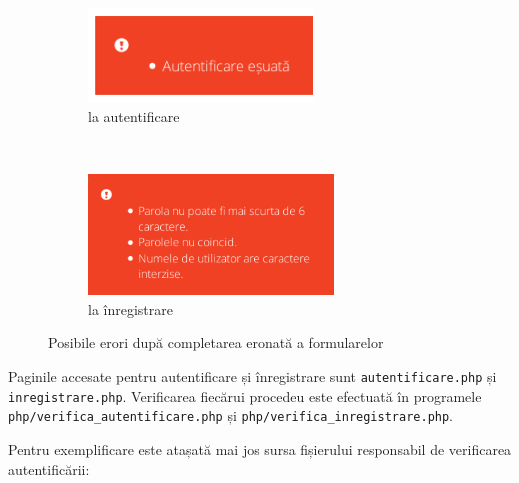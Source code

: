 \documentclass[12pt,a4paper]{article}
\begin{document}
\begin{figure}[h!]
        \centering
        \begin{subfigure}[b]{0.35\textwidth}
                \includegraphics[height=2.5cm]{img/fail1.png}
                \caption{la autentificare}
        \end{subfigure}%
        ~ \qquad 
        \begin{subfigure}[b]{0.55\textwidth}
                \includegraphics[height=3.2cm]{img/fail2.png}
                \caption{la înregistrare}
        \end{subfigure}
        \caption{Posibile erori după completarea eronată a formularelor}%
\end{figure}

Paginile accesate pentru autentificare și înregistrare sunt \texttt{autentificare.php} și
\texttt{inregistrare.php}. Verificarea fiecărui procedeu este efectuată în programele
\texttt{php/verifica\_autentificare.php} și \texttt{php/verifica\_inregistrare.php}.

\vfill

Pentru exemplificare este atașată mai jos sursa fișierului responsabil de verificarea autentificării:
\end{document}

